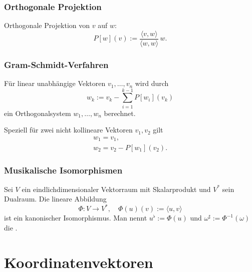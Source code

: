 \subsubsection{Orthogonale Projektion}
Orthogonale Projektion von $v$ auf $w$:
\begin{equation}
P[w](v) := \frac{\langle v,w\rangle}{\langle w,w\rangle}\,w.
\end{equation}
\subsubsection{Gram-Schmidt-Verfahren}
Für linear unabhängige Vektoren $v_1,\ldots,v_n$
wird durch%
\begin{equation}
w_k := v_k - \sum_{i=1}^{k-1} P[w_i](v_k)
\end{equation}
ein Orthogonalsystem $w_1,\ldots,w_n$ berechnet.

Speziell für zwei nicht kollineare Vektoren $v_1,v_2$ gilt
\begin{gather}
w_1=v_1,\\
w_2=v_2-P[w_1](v_2).
\end{gather}

\newpage
\subsubsection{Musikalische Isomorphismen}
\begin{definition}%
\mbox{}\newline
Sei $V$ ein eindlichdimensionaler Vektorraum
mit Skalarprodukt und $V^*$ sein Dualraum.
Die lineare Abbildung%
\begin{equation}
\Phi\colon V\to V^*,\quad \Phi(u)(v):=\langle u,v\rangle
\end{equation}
ist ein kanonischer Isomorphismus.%
Man nennt $u^\flat:=\Phi(u)$
und $\omega^\sharp:=\Phi^{-1}(\omega)$ die .
\end{definition}

\section{Koordinatenvektoren}
